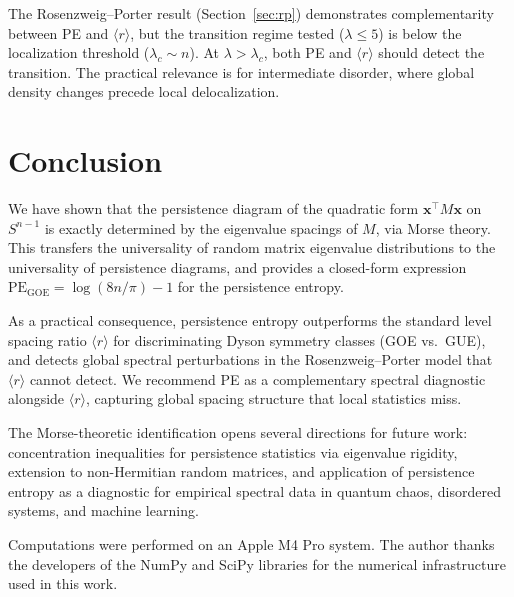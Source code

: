 \documentclass[aps,pre,twocolumn,superscriptaddress,showpacs]{revtex4-2}
\begin{document}
The Rosenzweig--Porter result (Section~\ref{sec:rp}) demonstrates complementarity between PE and $\langle r \rangle$, but the transition regime tested ($\lambda \le 5$) is below the localization threshold ($\lambda_c \sim n$). At $\lambda > \lambda_c$, both PE and $\langle r \rangle$ should detect the transition. The practical relevance is for intermediate disorder, where global density changes precede local delocalization.

\section{Conclusion}
\label{sec:conclusion}

We have shown that the persistence diagram of the quadratic form $\mathbf{x}^\top M \mathbf{x}$ on $S^{n-1}$ is exactly determined by the eigenvalue spacings of $M$, via Morse theory. This transfers the universality of random matrix eigenvalue distributions to the universality of persistence diagrams, and provides a closed-form expression $\mathrm{PE}_{\mathrm{GOE}} = \log(8n/\pi) - 1$ for the persistence entropy.

As a practical consequence, persistence entropy outperforms the standard level spacing ratio $\langle r \rangle$ for discriminating Dyson symmetry classes (GOE vs.\ GUE), and detects global spectral perturbations in the Rosenzweig--Porter model that $\langle r \rangle$ cannot detect. We recommend PE as a complementary spectral diagnostic alongside $\langle r \rangle$, capturing global spacing structure that local statistics miss.

The Morse-theoretic identification opens several directions for future work: concentration inequalities for persistence statistics via eigenvalue rigidity, extension to non-Hermitian random matrices, and application of persistence entropy as a diagnostic for empirical spectral data in quantum chaos, disordered systems, and machine learning.

\begin{acknowledgments}
Computations were performed on an Apple M4 Pro system. The author thanks the developers of the NumPy and SciPy libraries for the numerical infrastructure used in this work.
\end{acknowledgments}
\end{document}
